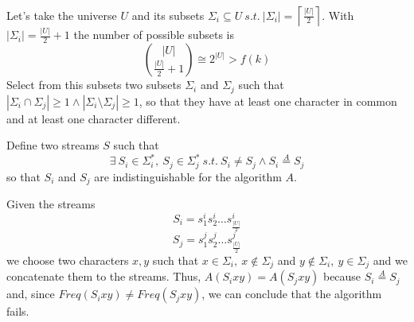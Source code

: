 \documentclass{article}
\begin{document}
Let's take the universe $U$ and its subsets $\Sigma_i\subseteq U\ s.t.\ |\Sigma_i|=\left\lceil \frac{|U|}{2} \right\rceil$. With $|\Sigma_i|=\frac{|U|}{2}+1$ the number of possible subsets is $$\binom{|U|}{\frac{|U|}{2}+1}\cong 2^{|U|}>f(k)$$
Select from this subsets two subsets $\Sigma_i$ and $\Sigma_j$ such that $|\Sigma_i \cap \Sigma_j| \geq 1 \land |\Sigma_i \setminus \Sigma_j| \geq 1$, so that they have at least one character in common and at least one character different. 

Define two streams $S$ such that $$\exists\ S_i\in\Sigma_i^*,\ S_j\in\Sigma_j^*\ s.t.\ S_i\neq S_j \land S_i\overset{A}{=}S_j$$ so that $S_i$ and $S_j$ are indistinguishable for the algorithm $A$.

Given the streams $$S_i=s_1^i s_2^i \ldots s_\frac{|U|}{2}^i$$ $$S_j=s_1^j s_2^j \ldots s_\frac{|U|}{2}^j$$ we choose two characters $x,y$ such that $x\in \Sigma_i,\ x\notin \Sigma_j$ and $y\notin \Sigma_i,\ y\in \Sigma_j$ and we concatenate them to the streams.
Thus, $A(S_i xy)=A(S_j xy)$ because $S_i\overset{A}{=}S_j$ and, since $Freq(S_i xy)\neq Freq(S_j xy)$, we can conclude that the algorithm fails.


\end{document}
